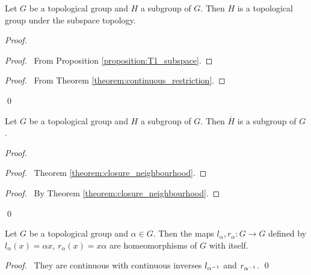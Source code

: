 \begin{lemma}
    Let $G$ be a topological group and $H$ a subgroup of $G$. Then $H$ is a topological group
    under the subspace topology.
\end{lemma}

\begin{proof}
    \pf
    \begin{proof}
        \pf\ From Proposition \ref{proposition:T1_subspace}.
    \end{proof}
    \begin{proof}
        \pf\ From Theorem \ref{theorem:continuous_restriction}.
    \end{proof}
    \qed
\end{proof}

\begin{lemma}
    Let $G$ be a topological group and $H$ a subgroup of $G$. Then 
    $\overline{H}$ is a subgroup of $G$.
\end{lemma}

\begin{proof}
    \pf
    \begin{proof}
        \pf\ Theorem \ref{theorem:closure_neighbourhood}.
    \end{proof}
    \qedstep
    \begin{proof}
        \pf\ By Theorem \ref{theorem:closure_neighbourhood}.
    \end{proof}
    \qed
\end{proof}

\begin{proposition}
    Let $G$ be a topological group and $\alpha \in G$. Then the maps
    $l_\alpha, r_\alpha : G \rightarrow G$ defined by $l_\alpha(x) = \alpha x$,
    $r_\alpha(x) = x\alpha$ are homeomorphisms of $G$ with itself.
\end{proposition}

\begin{proof}
    \pf\ They are continuous with continuous inverses $l_{{\alpha}^{-1}}$ and
    $r_{{\alpha}^{-1}}$. \qed
\end{proof}

